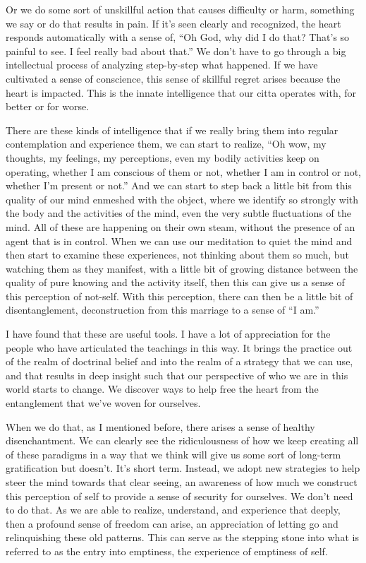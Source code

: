 Or we do some sort of unskillful action that causes difficulty or harm, something we say or do that results in pain. If it's seen clearly and recognized, the heart responds automatically with a sense of, ``Oh God, why did I do that? That's so painful to see. I feel really bad about that.'' We don't have to go through a big intellectual process of analyzing step-by-step what happened. If we have cultivated a sense of conscience, this sense of skillful regret arises because the heart is impacted. This is the innate intelligence that our citta operates with, for better or for worse.~

There are these kinds of intelligence that if we really bring them into regular contemplation and experience them, we can start to realize, ``Oh wow, my thoughts, my feelings, my perceptions, even my bodily activities keep on operating, whether I am conscious of them or not, whether I am in control or not, whether I'm present or not.'' And we can start to step back a little bit from this quality of our mind enmeshed with the object, where we identify so strongly with the body and the activities of the mind, even the very subtle fluctuations of the mind. All of these are happening on their own steam, without the presence of an agent that is in control. When we can use our meditation to quiet the mind and then start to examine these experiences, not thinking about them so much, but watching them as they manifest, with a little bit of growing distance between the quality of pure knowing and the activity itself, then this can give us a sense of this perception of not-self. With this perception, there can then be a little bit of disentanglement, deconstruction from this marriage to a sense of ``I am.''

I have found that these are useful tools. I have a lot of appreciation for the people who have articulated the teachings in this way. It brings the practice out of the realm of doctrinal belief and into the realm of a strategy that we can use, and that results in deep insight such that our perspective of who we are in this world starts to change. We discover ways to help free the heart from the entanglement that we've woven for ourselves.

When we do that, as I mentioned before, there arises a sense of healthy disenchantment. We can clearly see the ridiculousness of how we keep creating all of these paradigms in a way that we think will give us some sort of long-term gratification but doesn't. It's short term. Instead, we adopt new strategies to help steer the mind towards that clear seeing, an awareness of how much we construct this perception of self to provide a sense of security for ourselves. We don't need to do that. As we are able to realize, understand, and experience that deeply, then a profound sense of freedom can arise, an appreciation of letting go and relinquishing these old patterns. This can serve as the stepping stone into what is referred to as the entry into emptiness, the experience of emptiness of self.

